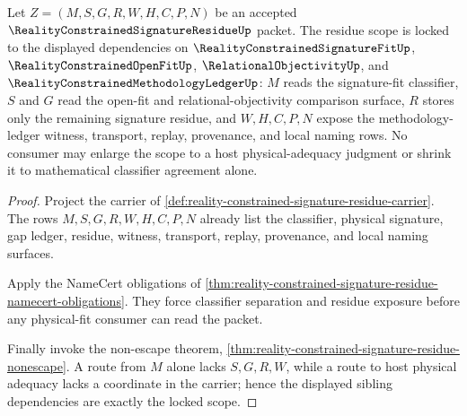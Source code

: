 
\begin{theorem}
\label{thm:reality-constrained-signature-residue-scope-lock}
Let $Z=(M,S,G,R,W,H,C,P,N)$ be an accepted $\RealityConstrainedSignatureResidueUp$ packet. The residue scope is locked to the displayed dependencies on $\RealityConstrainedSignatureFitUp$, $\RealityConstrainedOpenFitUp$, $\RelationalObjectivityUp$, and $\RealityConstrainedMethodologyLedgerUp$: $M$ reads the signature-fit classifier, $S$ and $G$ read the open-fit and relational-objectivity comparison surface, $R$ stores only the remaining signature residue, and $W,H,C,P,N$ expose the methodology-ledger witness, transport, replay, provenance, and local naming rows. No consumer may enlarge the scope to a host physical-adequacy judgment or shrink it to mathematical classifier agreement alone.
\end{theorem}
\begin{proof}
Project the carrier of \autoref{def:reality-constrained-signature-residue-carrier}. The rows $M,S,G,R,W,H,C,P,N$ already list the classifier, physical signature, gap ledger, residue, witness, transport, replay, provenance, and local naming surfaces.

Apply the NameCert obligations of \autoref{thm:reality-constrained-signature-residue-namecert-obligations}. They force classifier separation and residue exposure before any physical-fit consumer can read the packet.

Finally invoke the non-escape theorem, \autoref{thm:reality-constrained-signature-residue-nonescape}. A route from $M$ alone lacks $S,G,R,W$, while a route to host physical adequacy lacks a coordinate in the carrier; hence the displayed sibling dependencies are exactly the locked scope.
\end{proof}

